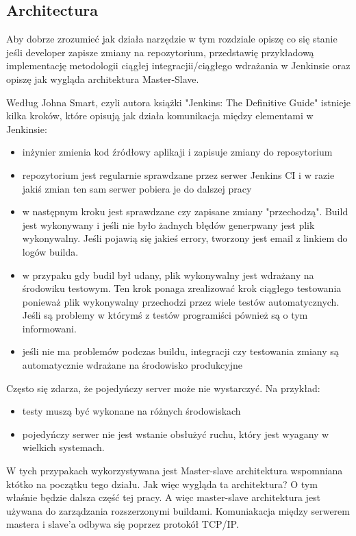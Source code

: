 \subsection{Architectura}

Aby dobrze zrozumieć jak działa narzędzie w tym rozdziale opiszę co się stanie jeśli developer zapisze zmiany na repozytorium, przedstawię przykładową implementację metodologii ciągłej integracjii/ciągłego wdrażania w Jenkinsie oraz opiszę jak wygląda architektura Master-Slave.

Według Johna Smart, czyli autora książki "Jenkins: The Definitive Guide" istnieje kilka kroków, które opisują jak działa komunikacja między elementami w Jenkinsie: 
\begin{itemize}
    \item inżynier zmienia kod źródłowy aplikaji i zapisuje zmiany do reposytorium
    \item repozytorium jest regularnie sprawdzane przez serwer Jenkins CI i w razie jakiś zmian ten sam serwer pobiera je do dalszej pracy
    \item w następnym kroku jest sprawdzane czy zapisane zmiany "przechodzą". Build  jest wykonywany i jeśli nie było żadnych błędów generpwany jest plik wykonywalny. Jeśli pojawią się jakieś errory, tworzony jest email z linkiem do logów builda. 
    \item w przypaku gdy budil był udany, plik wykonywalny jest wdrażany na środowiku testowym. Ten krok ponaga zrealizować krok ciągłego testowania ponieważ plik wykonywalny przechodzi przez wiele testów automatycznych. Jeśli są problemy w którymś z testów programiści pównież są o tym informowani.
    \item jeśli nie ma problemów podczas buildu, integracji czy testowania zmiany są automatycznie wdrażane na środowisko produkcyjne
\end{itemize}



Często się zdarza, że pojedyńczy server może nie wystarczyć. Na przykład:
\begin{itemize}
    \item testy muszą być wykonane na różnych środowiskach
    \item pojedyńczy serwer nie jest wstanie obsłużyć ruchu, który jest wyagany w wielkich systemach.
\end{itemize}

W tych przypakach wykorzystywana jest Master-slave architektura wspomniana któtko na początku tego działu. Jak więc wygląda ta architektura? O tym właśnie będzie dalsza część tej pracy. 
A więc master-slave architektura jest używana do zarządzania rozszerzonymi buildami. Komuniakacja między serwerem mastera i slave'a odbywa się poprzez protokół TCP/IP. 


